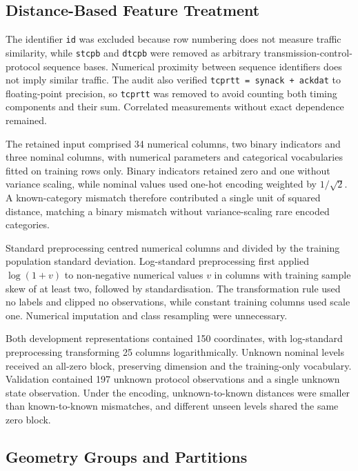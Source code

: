 \subsection{Distance-Based Feature Treatment}

The identifier \texttt{id} was excluded because row numbering does not measure traffic similarity, while \texttt{stcpb} and \texttt{dtcpb} were removed as arbitrary transmission-control-protocol sequence bases. Numerical proximity between sequence identifiers does not imply similar traffic. The audit also verified \texttt{tcprtt = synack + ackdat} to floating-point precision, so \texttt{tcprtt} was removed to avoid counting both timing components and their sum. Correlated measurements without exact dependence remained.

The retained input comprised 34 numerical columns, two binary indicators and three nominal columns, with numerical parameters and categorical vocabularies fitted on training rows only. Binary indicators retained zero and one without variance scaling, while nominal values used one-hot encoding weighted by $1/\sqrt{2}$. A known-category mismatch therefore contributed a single unit of squared distance, matching a binary mismatch without variance-scaling rare encoded categories.

Standard preprocessing centred numerical columns and divided by the training population standard deviation. Log-standard preprocessing first applied $\log(1+v)$ to non-negative numerical values $v$ in columns with training sample skew of at least two, followed by standardisation. The transformation rule used no labels and clipped no observations, while constant training columns used scale one. Numerical imputation and class resampling were unnecessary.

Both development representations contained 150 coordinates, with log-standard preprocessing transforming 25 columns logarithmically. Unknown nominal levels received an all-zero block, preserving dimension and the training-only vocabulary. Validation contained 197 unknown protocol observations and a single unknown state observation. Under the encoding, unknown-to-known distances were smaller than known-to-known mismatches, and different unseen levels shared the same zero block.

\subsection{Geometry Groups and Partitions}

